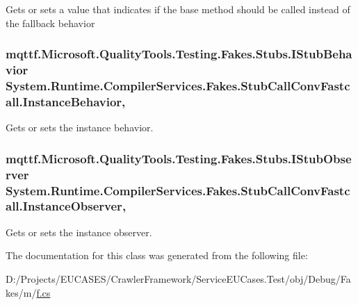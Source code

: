 Gets or sets a value that indicates if the base method should be called instead of the fallback behavior

\hypertarget{class_system_1_1_runtime_1_1_compiler_services_1_1_fakes_1_1_stub_call_conv_fastcall_a91644ee687591b4829f8e8c350fd3199}{
\subsubsection[{Instance\-Behavior}]{\setlength{\rightskip}{0pt plus 5cm}mqttf.\-Microsoft.\-Quality\-Tools.\-Testing.\-Fakes.\-Stubs.\-I\-Stub\-Behavior System.\-Runtime.\-Compiler\-Services.\-Fakes.\-Stub\-Call\-Conv\-Fastcall.\-Instance\-Behavior\hspace{0.3cm}{\ttfamily [get]}, {\ttfamily [set]}}}\label{class_system_1_1_runtime_1_1_compiler_services_1_1_fakes_1_1_stub_call_conv_fastcall_a91644ee687591b4829f8e8c350fd3199}


Gets or sets the instance behavior.

\hypertarget{class_system_1_1_runtime_1_1_compiler_services_1_1_fakes_1_1_stub_call_conv_fastcall_a9a81da5b4daae5c60aad1a0a5b3b19cb}{
\subsubsection[{Instance\-Observer}]{\setlength{\rightskip}{0pt plus 5cm}mqttf.\-Microsoft.\-Quality\-Tools.\-Testing.\-Fakes.\-Stubs.\-I\-Stub\-Observer System.\-Runtime.\-Compiler\-Services.\-Fakes.\-Stub\-Call\-Conv\-Fastcall.\-Instance\-Observer\hspace{0.3cm}{\ttfamily [get]}, {\ttfamily [set]}}}\label{class_system_1_1_runtime_1_1_compiler_services_1_1_fakes_1_1_stub_call_conv_fastcall_a9a81da5b4daae5c60aad1a0a5b3b19cb}


Gets or sets the instance observer.



The documentation for this class was generated from the following file\-:\begin{DoxyCompactItemize}
\item 
D\-:/\-Projects/\-E\-U\-C\-A\-S\-E\-S/\-Crawler\-Framework/\-Service\-E\-U\-Cases.\-Test/obj/\-Debug/\-Fakes/m/\hyperlink{m_2f_8cs}{f.\-cs}\end{DoxyCompactItemize}

